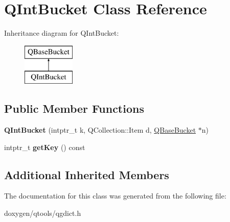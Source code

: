 \hypertarget{class_q_int_bucket}{}\section{Q\+Int\+Bucket Class Reference}
\label{class_q_int_bucket}
Inheritance diagram for Q\+Int\+Bucket\+:\begin{figure}[H]
\begin{center}
\leavevmode
\includegraphics[height=2.000000cm]{class_q_int_bucket}
\end{center}
\end{figure}
\subsection*{Public Member Functions}
\begin{DoxyCompactItemize}
\item 
\mbox{\label{class_q_int_bucket_ad2d5c561235fdfcc11787a9147eb3490}} 
{\bfseries Q\+Int\+Bucket} (intptr\+\_\+t k, Q\+Collection\+::\+Item d, \mbox{\hyperlink{class_q_base_bucket}{Q\+Base\+Bucket}} $\ast$n)
\item 
\mbox{\label{class_q_int_bucket_a3875ecb6dd5dc6a57a0b3cdeda8f4942}} 
intptr\+\_\+t {\bfseries get\+Key} () const
\end{DoxyCompactItemize}
\subsection*{Additional Inherited Members}


The documentation for this class was generated from the following file\+:\begin{DoxyCompactItemize}
\item 
doxygen/qtools/qgdict.\+h\end{DoxyCompactItemize}
